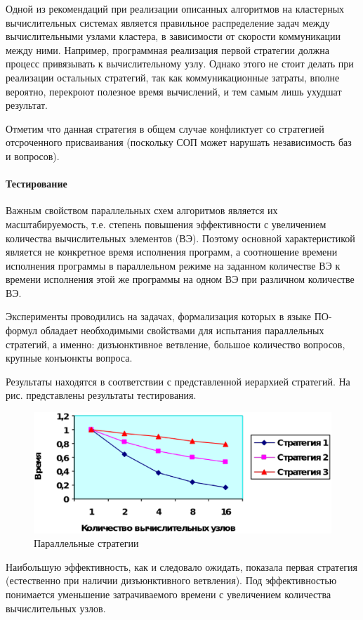 Одной из рекомендаций при реализации описанных алгоритмов на кластерных вычислительных системах является правильное распределение задач между вычислительными узлами кластера, в зависимости от скорости коммуникации между ними. Например, программная реализация первой стратегии должна процесс привязывать к вычислительному узлу. Однако этого не стоит делать при реализации остальных стратегий, так как коммуникационные затраты, вполне вероятно, перекроют полезное время вычислений, и тем самым лишь ухудшат результат. 

Отметим что данная стратегия в общем случае конфликтует со стратегией отсроченного присваивания (поскольку СОП может нарушать независимость баз и вопросов).

\paragraph{Тестирование}
Важным свойством параллельных схем алгоритмов является их масштабируемость, т.е. степень повышения эффективности с увеличением количества вычислительных элементов (ВЭ). Поэтому основной характеристикой является не конкретное время исполнения программ, а соотношение времени исполнения программы в параллельном режиме на заданном количестве ВЭ к времени исполнения этой же программы на одном ВЭ при различном количестве ВЭ.

Эксперименты проводились на задачах, формализация которых в языке ПО-формул обладает необходимыми свойствами для испытания параллельных стратегий, а именно: дизъюнктивное ветвление, большое количество вопросов, крупные конъюнкты вопроса.

Результаты находятся в соответствии с представленной иерархией стратегий. На рис. представлены результаты тестирования.

\begin{figure}[h]
	\centering
	\includegraphics[width=0.6\linewidth]{pics/Parallel.eps}
	\caption{Параллельные стратегии}
	\label{fig:parallel}
\end{figure}

Наибольшую эффективность, как и следовало ожидать, показала первая стратегия (естественно при наличии дизъюнктивного ветвления). Под эффективностью понимается уменьшение затрачиваемого времени с увеличением количества вычислительных узлов.


